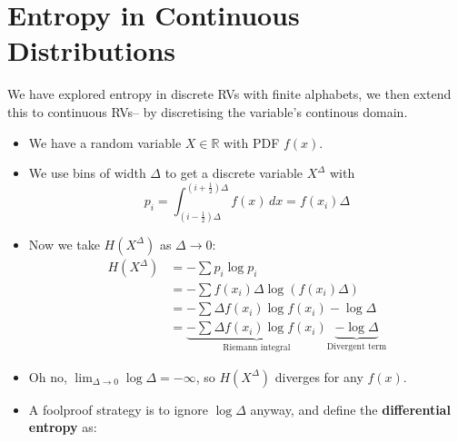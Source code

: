 
\section{Entropy in Continuous Distributions}

We have explored entropy in discrete RVs with finite alphabets, we then extend this to continuous RVs– by discretising the variable's continous domain.

\begin{itemize}
    \item We have a random variable \( X \in \mathbb{R} \) with PDF \( f(x) \).
    \item We use bins of width \( \Delta \) to get a discrete variable \( X^{\Delta} \) with
    \[
        p_i = \int_{(i - \frac{1}{2})\Delta}^{(i + \frac{1}{2})\Delta} f(x) \, dx = f(x_i) \Delta
    \]
    \item Now we take \( H(X^{\Delta}) \) as \( \Delta \to 0 \):
    \begin{align*}
        H(X^{\Delta}) &= -\sum p_i \log p_i \\
        &= -\sum f(x_i) \Delta \log(f(x_i) \Delta) \\
        &= -\sum \Delta f(x_i) \log f(x_i) - \log \Delta \\
        &= \underbrace{-\sum \Delta f(x_i) \log f(x_i)}_{\text{Riemann integral}}  \underbrace{- \log \Delta}_{\text{Divergent term}}
    \end{align*}
    \item Oh no, \( \lim_{\Delta \to 0} \log \Delta = -\infty \), so \( H(X^{\Delta}) \) diverges for any \( f(x) \).
    \item A foolproof strategy is to ignore $\log \Delta$ anyway, and define the \textbf{differential entropy} as:
\end{itemize}

